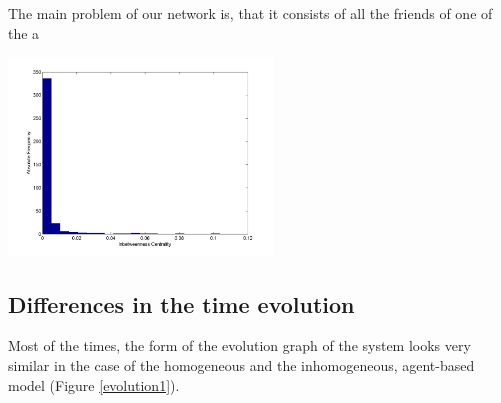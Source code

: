 \begin{minipage}{0.5\textwidth}
The main problem of our network is, that it consists of all the friends of one of the a
\end{minipage}
\begin{minipage}{0.5\textwidth}
\includegraphics[width=7cm]{network_centralityhist.png}
\label{2peaks}
\end{minipage}




\subsection{Differences in the time evolution}

Most of the times, the form of the evolution graph of the system looks very similar in the case of the homogeneous and the inhomogeneous, agent-based model (Figure \ref{evolution1}).

